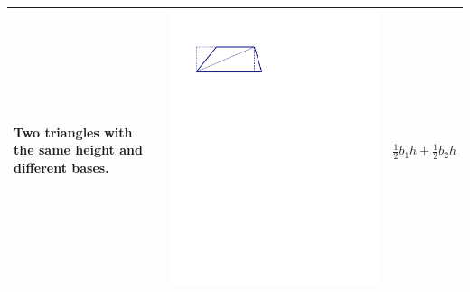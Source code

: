 \documentclass{ximera}
\begin{document}
{\begin{tabular}{|>{\centering\arraybackslash}m{2.5cm}|>{\centering\arraybackslash}m{9.5cm}|c|}
Two triangles with the same height and different bases. & \includegraphics[scale=0.7]{./graphics/trapezoid4.pdf} & $\frac{1}{2}b_1h + \frac{1}{2}b_2h$ \\ \hline

\end{tabular}}
\end{document}
